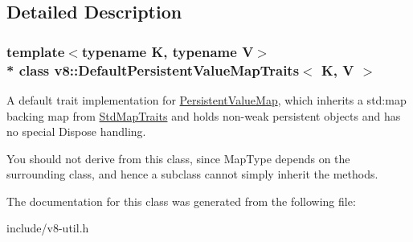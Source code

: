 \subsection{Detailed Description}
\subsubsection*{template$<$typename K, typename V$>$\\*
class v8\+::\+Default\+Persistent\+Value\+Map\+Traits$<$ K, V $>$}

A default trait implementation for \hyperlink{classv8_1_1_persistent_value_map}{Persistent\+Value\+Map}, which inherits a std\+:map backing map from \hyperlink{classv8_1_1_std_map_traits}{Std\+Map\+Traits} and holds non-\/weak persistent objects and has no special Dispose handling.

You should not derive from this class, since Map\+Type depends on the surrounding class, and hence a subclass cannot simply inherit the methods. 

The documentation for this class was generated from the following file\+:\begin{DoxyCompactItemize}
\item 
include/v8-\/util.\+h\end{DoxyCompactItemize}
